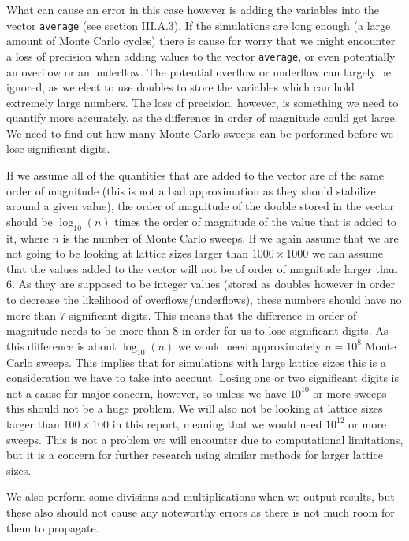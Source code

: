 \documentclass[reprint,english,notitlepage]{revtex4-1}  %
\begin{document}
What can cause an error in this case however is adding the variables into the vector \verb+average+ (see section \hyperref[sec:III:A:iii]{III.A.3}). If the simulations are long enough (a large amount of Monte Carlo cycles) there is cause for worry that we might encounter a loss of precision when adding values to the vector \verb+average+, or even potentially an overflow or an underflow. The potential overflow or underflow can largely be ignored, as we elect to use doubles to store the variables which can hold extremely large numbers. The loss of precision, however, is something we need to quantify more accurately, as the difference in order of magnitude could get large. We need to find out how many Monte Carlo sweeps can be performed before we lose significant digits. 

If we assume all of the quantities that are added to the vector are of the same order of magnitude (this is not a bad approximation as they should stabilize around a given value), the order of magnitude of the double stored in the vector should be $\log_{10}(n)$ times the order of magnitude of the value that is added to it, where $n$ is the number of Monte Carlo sweeps. If we again assume that we are not going to be looking at lattice sizes larger than $1000\times 1000$ we can assume that the values added to the vector will not be of order of magnitude larger than $6$. As they are supposed to be integer values (stored as doubles however in order to decrease the likelihood of overflows/underflows), these numbers should have no more than $7$ significant digits. This means that the difference in order of magnitude needs to be more than $8$ in order for us to lose significant digits. As this difference is about $\log_{10}(n)$ we would need approximately $n=10^8$ Monte Carlo sweeps. This implies that for simulations with large lattice sizes this is a consideration we have to take into account. Losing one or two significant digits is not a cause for major concern, however, so unless we have $10^{10}$ or more sweeps this should not be a huge problem. We will also not be looking at lattice sizes larger than $100 \times 100$ in this report, meaning that we would need $10^{12}$ or more sweeps. This is not a problem we will encounter due to computational limitations, but it is a concern for further research using similar methods for larger lattice sizes.
      
We also perform some divisions and multiplications when we output results, but these also should not cause any noteworthy errors as there is not much room for them to propagate. 
\end{document}
